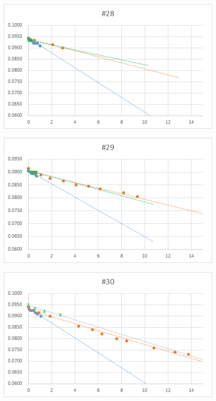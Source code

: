   \begin{figure}[htbp]
    \centering
       \includegraphics[width=120mm]{vol_028.png}
  \end{figure}
  \begin{figure}[htbp]
    \centering
       \includegraphics[width=120mm]{vol_029.png}
  \end{figure}
  \begin{figure}[htbp]
    \centering
       \includegraphics[width=120mm]{vol_030.png}
  \end{figure}
